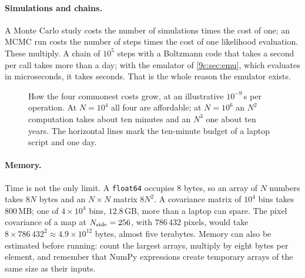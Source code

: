 \paragraph{Simulations and chains.} A Monte Carlo study costs the number of simulations times the cost of one; an MCMC run costs the number of steps times the cost of one likelihood evaluation. These multiply. A chain of $10^5$ steps with a Boltzmann code that takes a second per call takes more than a day; with the emulator of \cref{9c:sec:emu}, which evaluates in microseconds, it takes seconds. That is the whole reason the emulator exists.

\begin{figure}[htbp]
\centering
{}
\caption{How the four commonest costs grow, at an illustrative $10^{-9}$\,s per operation. At $N=10^4$ all four are affordable; at $N=10^6$ an $N^2$ computation takes about ten minutes and an $N^3$ one about ten years. The horizontal lines mark the ten-minute budget of a laptop script and one day.}
\label{T0a:fig:growth}
\end{figure}

\paragraph{Memory.} Time is not the only limit. A \texttt{float64} occupies $8$ bytes, so an array of $N$ numbers takes $8N$ bytes and an $N\times N$ matrix $8N^2$. A covariance matrix of $10^4$ bins takes $800$\,MB; one of $4\times10^4$ bins, $12.8$\,GB, more than a laptop can spare. The pixel covariance of a map at $N_{\rm side}=256$, with $786\,432$ pixels, would take $8\times786\,432^2\approx4.9\times10^{12}$ bytes, almost five terabytes. Memory can also be estimated before running: count the largest arrays, multiply by eight bytes per element, and remember that NumPy expressions create temporary arrays of the same size as their inputs.

